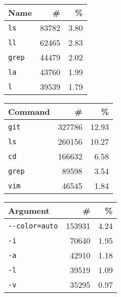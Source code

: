 \begin{adjustbox}{width=\columnwidth,center}
\begin{tabular}{lrr}
\toprule
   Name &           \# &          \% \\
\midrule
    \verb|ls| &  \num{83782} &  \num{3.80} \\
    \verb|ll| &  \num{62465} &  \num{2.83} \\
  \verb|grep| &  \num{44479} &  \num{2.02} \\
    \verb|la| &  \num{43760} &  \num{1.99} \\
     \verb|l| &  \num{39539} &  \num{1.79} \\
\bottomrule
\end{tabular}
\hspace{0.2cm}
\begin{tabular}{lrr}
    \toprule
           Command &            \# &           \% \\
    \midrule
        \verb|git| &  \num{327786} &  \num{12.93} \\
         \verb|ls| &  \num{260156} &  \num{10.27} \\
         \verb|cd| &  \num{166632} &   \num{6.58} \\
       \verb|grep| &   \num{89598} &   \num{3.54} \\
        \verb|vim| &   \num{46545} &   \num{1.84} \\
    \bottomrule
\end{tabular}
\hspace{0.2cm}
\begin{tabular}{lrr}
    \toprule
                Argument &            \# &          \% \\
    \midrule
     \verb|--color=auto| &  \num{153931} &  \num{4.24} \\
               \verb|-i| &   \num{70640} &  \num{1.95} \\
               \verb|-a| &   \num{42910} &  \num{1.18} \\
               \verb|-l| &   \num{39519} &  \num{1.09} \\
               \verb|-v| &   \num{35295} &  \num{0.97} \\
    \bottomrule
\end{tabular}
\end{adjustbox}